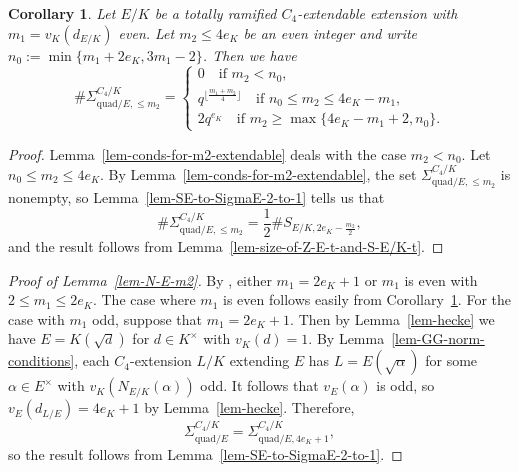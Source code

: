\documentclass[11pt]{amsart}
\theoremstyle{theorem}
\newtheorem{corollary}[theorem]{Corollary}
\theoremstyle{example}
\theoremstyle{definition}
\numberwithin{theorem}{section}
\numberwithin{theorem}{section}
\newcommand{\quadr}{\mathrm{quad}}
\begin{document}
\begin{corollary}
    \label{cor-size-of-Sigma_E_leq_m2}
    Let $E/K$ be a totally ramified $C_4$-extendable extension with $m_1 = v_K(d_{E/K})$ even. Let $m_2\leq 4e_K$ be an even integer and write $n_0 := \min\{m_1 + 2e_K, 3m_1 - 2\}$. Then we have 
    $$
    \# \Sigma_{\quadr/E, \leq m_2}^{C_4/K} = \begin{cases}
        0\quad\text{if $m_2 < n_0$},
        \\
        q^{\lfloor \frac{m_1 + m_2}{4}\rfloor} \quad\text{if $n_0 \leq m_2 \leq 4e_K - m_1$},
        \\
        2q^{e_K}\quad\text{if $m_2 \geq \max\{4e_K - m_1 + 2, n_0\}$}.
    \end{cases}
    $$
\end{corollary}
\begin{proof}
    Lemma~\ref{lem-conds-for-m2-extendable} deals with the case $m_2 < n_0$. Let $n_0 \leq m_2 \leq 4e_K$. By Lemma~\ref{lem-conds-for-m2-extendable}, the set $\Sigma_{\quadr/E,\leq m_2}^{C_4/K}$ is nonempty, so Lemma~\ref{lem-SE-to-SigmaE-2-to-1} tells us that 
    $$
    \# \Sigma_{\quadr/E,\leq m_2}^{C_4/K} = \frac{1}{2} \#S_{E/K,2e_K - \frac{m_2}{2}},
    $$
    and the result follows from Lemma~\ref{lem-size-of-Z-E-t-and-S-E/K-t}. 
\end{proof}
\begin{proof}[Proof of Lemma~\ref{lem-N-E-m2}]
    By \cite[Lemma~4.3]{tunnell}, either $m_1= 2e_K + 1$ or $m_1$ is even with $2 \leq m_1 \leq 2e_K$. The case where $m_1$ is even follows easily from Corollary~\ref{cor-size-of-Sigma_E_leq_m2}. For the case with $m_1$ odd, suppose that $m_1 = 2e_K + 1$. Then by Lemma~\ref{lem-hecke} we have $E = K(\sqrt{d})$ for $d\in K^\times$ with $v_K(d) = 1$. By Lemma~\ref{lem-GG-norm-conditions}, each $C_4$-extension $L/K$ extending $E$ has $L = E(\sqrt{\alpha})$ for some $\alpha \in E^\times$ with $v_K(N_{E/K}(\alpha))$ odd. It follows that $v_E(\alpha)$ is odd, so $v_E(d_{L/E}) = 4e_K + 1$ by Lemma~\ref{lem-hecke}. Therefore, 
    $$
    \Sigma_{\quadr/E}^{C_4/K} = \Sigma_{\quadr/E, 4e_K + 1}^{C_4/K}, 
    $$
    so the result follows from Lemma~\ref{lem-SE-to-SigmaE-2-to-1}.
\end{proof}
\end{document}
